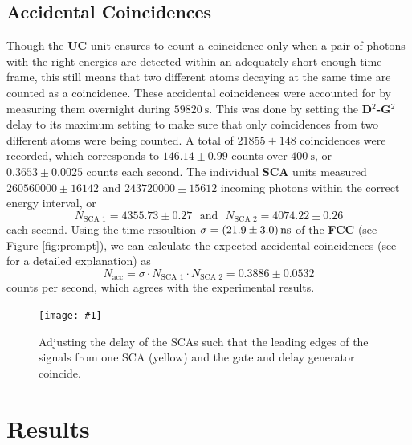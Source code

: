 \documentclass[twocolumn]{article}
\newcommand{\insertFigure}[1]{%
   \texttt{[image: \#1]}%
}
\begin{document}
\subsection{Accidental Coincidences} \label{sec:acc}
Though the \textbf{UC} unit ensures to count a coincidence only when a pair of photons with the right energies are detected within an adequately short enough time frame, this still means that two different atoms decaying at the same time are counted as a coincidence. These accidental coincidences were accounted for by measuring them overnight during $\SI{59820}{\second}$. This was done by setting the \textbf{D$^2$-G$^2$} delay to its maximum setting to make sure that only coincidences from two different atoms were being counted. A total of $21855 \pm 148$ coincidences were recorded, which corresponds to $146.14 \pm 0.99$ counts over $\SI{400}{\second}$, or $0.3653 \pm 0.0025$ counts each second. The individual \textbf{SCA} units measured $260560000 \pm 16142$ and $243720000 \pm 15612$ incoming photons within the correct energy interval, or
 \begin{equation}
 N_{\text{SCA 1}} = 4355.73 \pm 0.27 \hspace{8pt} \text{and} \hspace{8pt} N_{\text{SCA 2}} =  4074.22 \pm 0.26 \nonumber
 \end{equation}
 each second. Using the time resoultion $\sigma = \SI[separate-uncertainty = true]{21.9 \pm 3.0}{\nano \second}$ of the \textbf{FCC} (see Figure \ref{fig:prompt}), we can calculate the expected accidental coincidences (see \cite{leo} for a detailed explanation) as
\begin{equation}
N_{\text{acc}} = \sigma \cdot N_{\text{SCA 1}} \cdot N_{\text{SCA 2}} = 0.3886 \pm 0.0532 \nonumber
\end{equation}
counts per second, which agrees with the experimental results.
\begin{figure}
\centering
\insertFigure{./screenshots/SC07_cropped.png}
\caption{Adjusting the delay of the SCAs such that the leading edges of the signals from one SCA (yellow) and the gate and delay generator coincide.}
\label{fig:sca-overlap}
\end{figure}

\section{Results}
\end{document}
